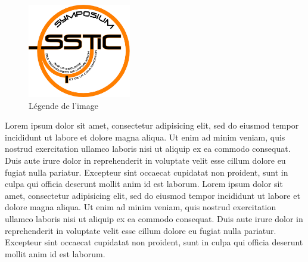 
\begin{figure}[ht]
  \centering
  \includegraphics[width=0.4\textwidth]{MonNom/img/archi}
  \caption{Légende de l'image}
  \label{fig:monnom:archi}
\end{figure}

Lorem ipsum dolor sit amet, consectetur adipisicing elit, sed do
eiusmod tempor incididunt ut labore et dolore magna aliqua. Ut enim ad
minim veniam, quis nostrud exercitation ullamco laboris nisi ut
aliquip ex ea commodo consequat. Duis aute irure dolor in
reprehenderit in voluptate velit esse cillum dolore eu fugiat nulla
pariatur. Excepteur sint occaecat cupidatat non proident, sunt in
culpa qui officia deserunt mollit anim id est laborum. Lorem ipsum
dolor sit amet, consectetur adipisicing elit, sed do eiusmod tempor
incididunt ut labore et dolore magna aliqua. Ut enim ad minim veniam,
quis nostrud exercitation ullamco laboris nisi ut aliquip ex ea
commodo consequat. Duis aute irure dolor in reprehenderit in voluptate
velit esse cillum dolore eu fugiat nulla pariatur. Excepteur sint
occaecat cupidatat non proident, sunt in culpa qui officia deserunt
mollit anim id est laborum.

